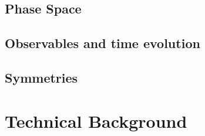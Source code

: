 \documentclass[handout,10pt]{beamer}
\begin{document}





\subsection{Phase Space}
\subcheckpoint	
	
	


\subsection{Observables and time evolution}
\subcheckpoint	
	

\subsection{Symmetries}
\subcheckpoint	
	
	



\section{Technical Background}
	\checkpoint
	
\end{document}
